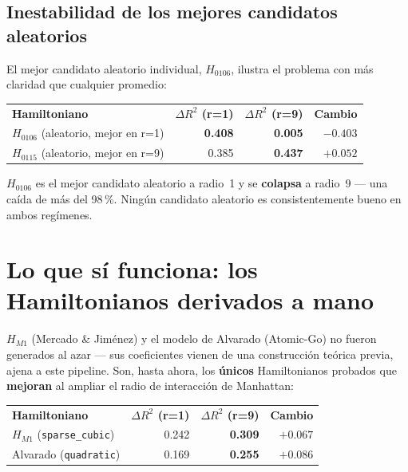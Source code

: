 \documentclass[11pt, a4paper]{article}
\newcommand{\TH}[1]{\cellcolor{cTHbg}\color{white}\textbf{#1}}
\newcommand{\good}[1]{\color{cGood}\textbf{#1}}
\newcommand{\bad}[1]{\color{cBad}\textbf{#1}}
\begin{document}
\subsection{Inestabilidad de los mejores candidatos aleatorios}

El mejor candidato aleatorio individual, $H_{0106}$, ilustra el
problema con m\'as claridad que cualquier promedio:

\medskip
\begin{center}
\begin{tabular}{lrrr}
  \TH{Hamiltoniano} & \TH{$\Delta R^2$ (r=1)} & \TH{$\Delta R^2$ (r=9)} & \TH{Cambio} \\[1pt]
  $H_{0106}$ (aleatorio, mejor en r=1) & \good{0.408} & \bad{0.005} & $-0.403$ \\
  $H_{0115}$ (aleatorio, mejor en r=9) & 0.385 & \good{0.437} & $+0.052$ \\
\end{tabular}
\end{center}
\medskip

$H_{0106}$ es el mejor candidato aleatorio a radio~1 y se
\textbf{colapsa} a radio~9 --- una ca\'ida de m\'as del 98\,\%. Ning\'un
candidato aleatorio es consistentemente bueno en ambos reg\'imenes.

\section{Lo que s\'i funciona: los Hamiltonianos derivados a mano}

$H_{M1}$ (Mercado \& Jim\'enez) y el modelo de Alvarado (Atomic-Go) no
fueron generados al azar --- sus coeficientes vienen de una construcci\'on
te\'orica previa, ajena a este pipeline. Son, hasta ahora, los
\textbf{\'unicos} Hamiltonianos probados que \textbf{mejoran} al ampliar
el radio de interacci\'on de Manhattan:

\medskip
\begin{center}
\begin{tabular}{lrrr}
  \TH{Hamiltoniano} & \TH{$\Delta R^2$ (r=1)} & \TH{$\Delta R^2$ (r=9)} & \TH{Cambio} \\[1pt]
  $H_{M1}$ (\texttt{sparse\_cubic}) & 0.242 & \good{0.309} & \good{$+0.067$} \\
  Alvarado (\texttt{quadratic})     & 0.169 & \good{0.255} & \good{$+0.086$} \\
\end{tabular}
\end{center}
\medskip
\end{document}
